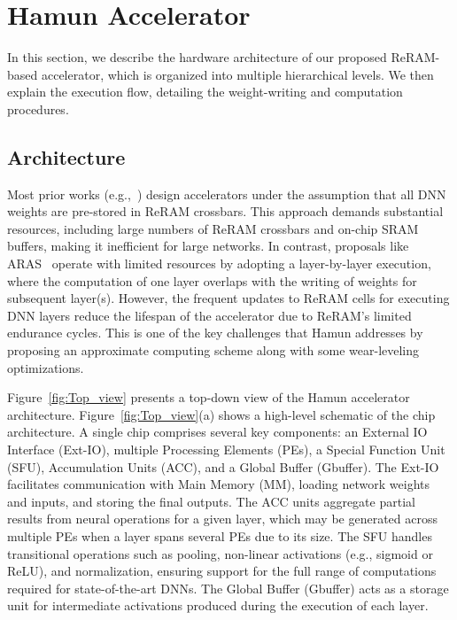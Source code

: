 \section{Hamun Accelerator}\label{s:Accelerator}
In this section, we describe the hardware architecture of our proposed ReRAM-based accelerator, which is organized into multiple hierarchical levels. We then explain the execution flow, detailing the weight-writing and computation procedures.

\subsection{Architecture}\label{subs:Architecture}
Most prior works (e.g.,~\cite{RAELLA, ISAAC}) design accelerators under the assumption that all DNN weights are pre-stored in ReRAM crossbars. This approach demands substantial resources, including large numbers of ReRAM crossbars and on-chip SRAM buffers, making it inefficient for large networks. In contrast, proposals like ARAS~\cite{ARAS} operate with limited resources by adopting a layer-by-layer execution, where the computation of one layer overlaps with the writing of weights for subsequent layer(s). However, the frequent updates to ReRAM cells for executing DNN layers reduce the lifespan of the accelerator due to ReRAM's limited endurance cycles. This is one of the key challenges that Hamun addresses by proposing an approximate computing scheme along with some wear-leveling optimizations.

Figure~\ref{fig:Top_view} presents a top-down view of the Hamun accelerator architecture. Figure~\ref{fig:Top_view}(a) shows a high-level schematic of the chip architecture. A single chip comprises several key components: an External IO Interface (Ext-IO), multiple Processing Elements (PEs), a Special Function Unit (SFU), Accumulation Units (ACC), and a Global Buffer (Gbuffer). The Ext-IO facilitates communication with Main Memory (MM), loading network weights and inputs, and storing the final outputs. The ACC units aggregate partial results from neural operations for a given layer, which may be generated across multiple PEs when a layer spans several PEs due to its size. The SFU handles transitional operations such as pooling, non-linear activations (e.g., sigmoid or ReLU), and normalization, ensuring support for the full range of computations required for state-of-the-art DNNs. The Global Buffer (Gbuffer) acts as a storage unit for intermediate activations produced during the execution of each layer.

